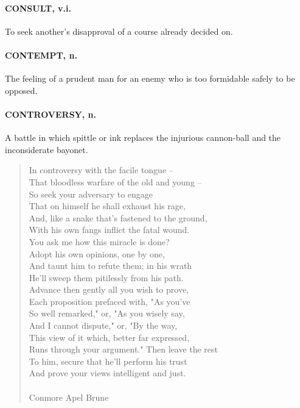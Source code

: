 \documentclass[11pt]{article}
\begin{document}
\paragraph{CONSULT, v.i.}  To seek another's disapproval of a course already
decided on.

\paragraph{CONTEMPT, n.}  The feeling of a prudent man for an enemy who is too
formidable safely to be opposed.

\paragraph{CONTROVERSY, n.}  A battle in which spittle or ink replaces the
injurious cannon-ball and the inconsiderate bayonet.

\begin{quote}   In controversy with the facile tongue -- \\
  That bloodless warfare of the old and young -- \\
  So seek your adversary to engage \\
  That on himself he shall exhaust his rage, \\
  And, like a snake that's fastened to the ground, \\
  With his own fangs inflict the fatal wound. \\
  You ask me how this miracle is done? \\
  Adopt his own opinions, one by one, \\
  And taunt him to refute them; in his wrath \\
  He'll sweep them pitilessly from his path. \\
  Advance then gently all you wish to prove, \\
  Each proposition prefaced with, "As you've \\
  So well remarked," or, "As you wisely say, \\
  And I cannot dispute," or, "By the way, \\
  This view of it which, better far expressed, \\
  Runs through your argument."  Then leave the rest \\
  To him, secure that he'll perform his trust \\
  And prove your views intelligent and just. \\
 \\
Conmore Apel Brune \end{quote}
\end{document}
